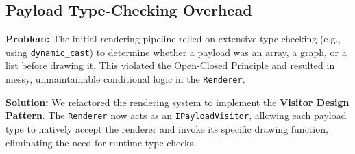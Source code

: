 \subsection{Payload Type-Checking Overhead}
\textbf{Problem:} The initial rendering pipeline relied on extensive type-checking (e.g., using \texttt{dynamic\_cast}) to determine whether a payload was an array, a graph, or a list before drawing it. This violated the Open-Closed Principle and resulted in messy, unmaintainable conditional logic in the \texttt{Renderer}.

\textbf{Solution:} We refactored the rendering system to implement the \textbf{Visitor Design Pattern}. The \texttt{Renderer} now acts as an \texttt{IPayloadVisitor}, allowing each payload type to natively accept the renderer and invoke its specific drawing function, eliminating the need for runtime type checks.

